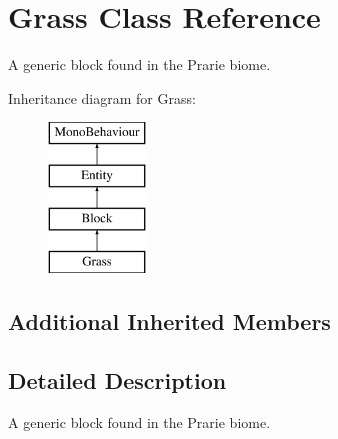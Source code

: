 \hypertarget{class_grass}{}\section{Grass Class Reference}
\label{class_grass}


A generic block found in the Prarie biome.  


Inheritance diagram for Grass\+:\begin{figure}[H]
\begin{center}
\leavevmode
\includegraphics[height=4.000000cm]{class_grass}
\end{center}
\end{figure}
\subsection*{Additional Inherited Members}


\subsection{Detailed Description}
A generic block found in the Prarie biome. 

